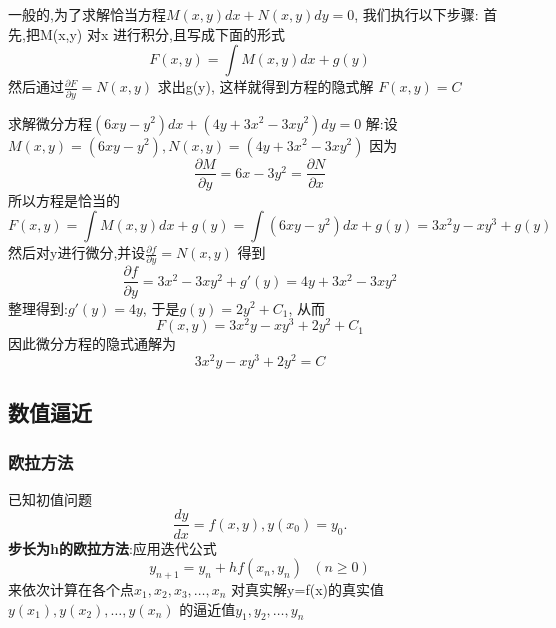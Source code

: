 \documentclass{article}
\begin{document}
\begin{note}
  一般的,为了求解恰当方程$M(x,y)dx+N(x,y)dy=0$, 我们执行以下步骤: \newline
  首先,把M(x,y) 对x 进行积分,且写成下面的形式
  $$
  F(x,y)=\int M(x,y)dx+g(y)
  $$
  然后通过$\frac{\partial F}{\partial y}=N(x,y)$ 求出g(y), 这样就得到方程的隐式解 $F(x,y)=C$
\end{note}
\begin{example}
  求解微分方程$(6xy-y^2)dx+(4y+3x^2-3xy^2)dy=0$ \newline
  解:设$M(x,y)=(6xy-y^2),N(x,y)=(4y+3x^2-3xy^2)$ 因为
  $$
  \frac{\partial M}{\partial y}=6x-3y^2=\frac{\partial N}{\partial x}
  $$
  所以方程是恰当的
  $$
  F(x,y)=\int M(x,y)dx+g(y)=\int (6xy-y^2)dx+g(y)=3x^2y-xy^3+g(y)
  $$
  然后对y进行微分,并设$\frac{\partial f}{\partial y}=N(x,y)$ 得到
  $$
  \frac{\partial f}{\partial y}=3x^2-3xy^2+g'(y)=4y+3x^2-3xy^2
  $$
  整理得到:$g'(y)=4y$, 于是$g(y)=2y^2+C_1$, 从而
  $$
  F(x,y)=3x^2y-xy^3+2y^2+C_1
  $$
  因此微分方程的隐式通解为$$3x^2y-xy^3+2y^2=C$$
\end{example}

\subsection{数值逼近}
\subsubsection{欧拉方法}
已知初值问题
\begin{equation}
  \frac{dy}{dx}=f(x,y),y(x_0)=y_0.
\end{equation}
{\bf 步长为h的欧拉方法}:应用迭代公式
\begin{equation}
  y_{n+1}=y_n+hf(x_n,y_n) ~~~(n\geqslant 0)
\end{equation}
来依次计算在各个点$x_1,x_2,x_3,\ldots,x_n$ 对真实解y=f(x)的真实值$y(x_1),y(x_2),\ldots,y(x_n)$ 的逼近值$y_1,y_2,\ldots,y_n$
\newline
\end{document}
